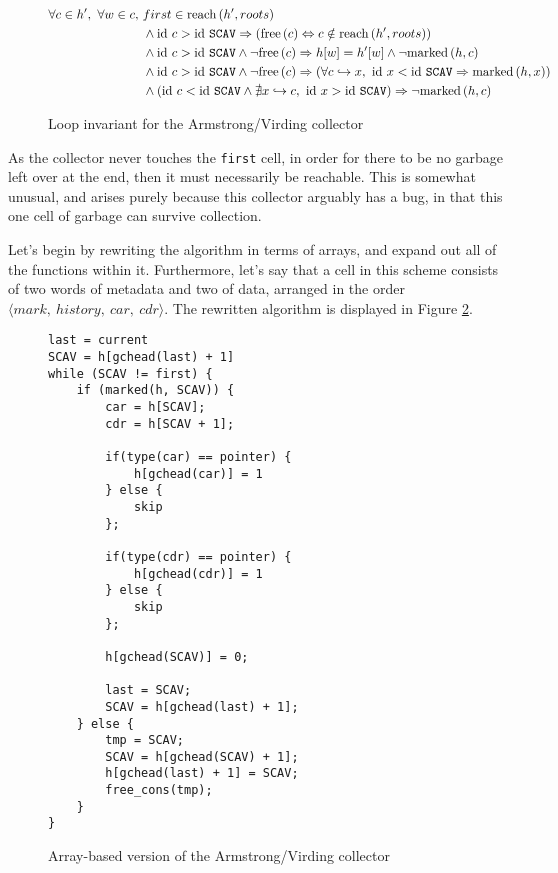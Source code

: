 \begin{figure}[t]
  \centering
  \begin{align*}
    \forall c \in h',\ \forall w \in c,\ &first \in \reach{h'}{roots}\\
%
    &\land \id~c > \id~\mathtt{SCAV} \implies (\free{c}
      \iff c \notin \reach{h'}{roots})\\
%
    &\land \id~c > \id~\mathtt{SCAV} \land \lnot\free{c}
      \implies h[w] = h'[w] \land \lnot \marked{h}{c}\\
%
    &\land \id~c > \id~\mathtt{SCAV} \land \lnot\free{c}
      \implies (\forall c \pointsto x,\ \id~x < \id~\mathtt{SCAV}
      \implies \marked{h}{x})\\
%
    &\land \left(\id~c < \id~\mathtt{SCAV} \land \nexists x \pointsto
      c,\ \id~x > \id~\mathtt{SCAV}\right) \implies \lnot\marked{h}{c}
  \end{align*}  
  \caption{Loop invariant for the Armstrong/Virding collector}
  \label{fig:marksweep-example-partial-invariant}
\end{figure}

As the collector never touches the \texttt{first} cell, in order for
there to be no garbage left over at the end, then it must necessarily
be reachable. This is somewhat unusual, and arises purely because this
collector arguably has a bug, in that this one cell of garbage can
survive collection.

Let's begin by rewriting the algorithm in terms of arrays, and expand
out all of the functions within it. Furthermore, let's say that a cell
in this scheme consists of two words of metadata and two of data,
arranged in the order $\langle mark,\ history,\ car,\ cdr
\rangle$. The rewritten algorithm is displayed in Figure
\ref{fig:marksweep-example-partial-arrays}.

\begin{figure}[t]
  \centering
  \begin{lstlisting}
last = current
SCAV = h[gchead(last) + 1]
while (SCAV != first) {
    if (marked(h, SCAV)) {
        car = h[SCAV];
        cdr = h[SCAV + 1];

        if(type(car) == pointer) {
            h[gchead(car)] = 1
        } else {
            skip
        };

        if(type(cdr) == pointer) {
            h[gchead(cdr)] = 1
        } else {
            skip
        };

        h[gchead(SCAV)] = 0;

        last = SCAV;
        SCAV = h[gchead(last) + 1];
    } else {
        tmp = SCAV;
        SCAV = h[gchead(SCAV) + 1];
        h[gchead(last) + 1] = SCAV;
        free_cons(tmp);
    }
}
  \end{lstlisting}
  \caption{Array-based version of the Armstrong/Virding collector}
  \label{fig:marksweep-example-partial-arrays}
\end{figure}

